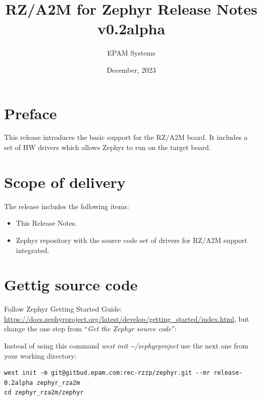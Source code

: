 \documentclass[11pt,a4paper,oneside]{article}
\begin{document}

\setcounter{secnumdepth}{4}
\setcounter{tocdepth}{4}

\title{RZ/A2M for Zephyr Release Notes v0.2alpha}
\author{EPAM Systems}
\date{December, 2023}

\maketitle

\tableofcontents

\clearpage

\section{Preface}\label{preface}

This release introduces the basic support for the RZ/A2M board. It
includes a set of HW drivers which allows Zephyr to run on the target
board.

\section{Scope of delivery}\label{scope-of-delivery}

The release includes the following items:

\begin{itemize}
\item This Release Notes.
\item Zephyr repository with the source code set of drivers for RZ/A2M support integrated.
\end{itemize}

\section{Gettig source code}\label{gettig-source-code}

Follow Zephyr Getting Started Guide:
\url{https://docs.zephyrproject.org/latest/develop/getting_started/index.html},
but change the one step from ``\emph{Get the Zephyr source code}'':

Instead of using this command \emph{west init
\textasciitilde/zephyrproject} use the next one from your working
directory:

\begin{lstlisting}
west init -m git@gitbud.epam.com:rec-rzzp/zephyr.git --mr release-0.2alpha zephyr_rza2m
cd zephyr_rza2m/zephyr
\end{lstlisting}
\end{document}
